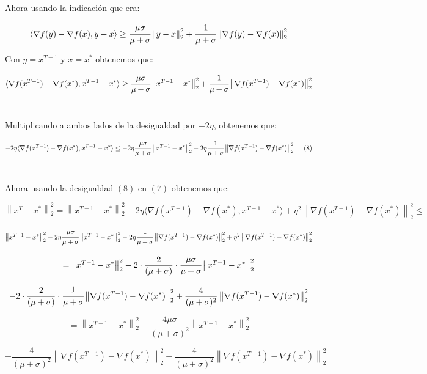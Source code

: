 \documentclass[11pt]{article}
\begin{document}
Ahora usando la indicación que era:

\[ \langle \nabla f(y) - \nabla f(x) , y - x \rangle  \geq  \cfrac{\mu \sigma}{\mu + \sigma} \left\| y-x \right\|_2^2 + \cfrac{1}{\mu + \sigma}\left\| \nabla f(y) - \nabla f(x) \right\|_2^2 \]

Con $ y = x^{T-1} $ y $ x = x^{*} $ obtenemos que: 

\[ \langle \nabla f(x^{T-1}) - \nabla f(x^{*}) , x^{T-1} - x^{*} \rangle  \geq  \cfrac{\mu \sigma}{\mu + \sigma} \left\| x^{T-1}-x^{*} \right\|_2^2 + \cfrac{1}{\mu + \sigma}\left\| \nabla f(x^{T-1}) - \nabla f(x^{*}) \right\|_2^2 \] \

Multiplicando a ambos lados de la desigualdad por $ - 2 \eta $, obtenemos que: 

\[ -2 \eta \langle \nabla f(x^{T-1}) - \nabla f(x^{*}) , x^{T-1} - x^{*} \rangle  \leq  - 2 \eta \cfrac{\mu \sigma}{\mu + \sigma} \left\| x^{T-1}-x^{*} \right\|_2^2 - 2 \eta \cfrac{1}{\mu + \sigma}\left\| \nabla f(x^{T-1}) - \nabla f(x^{*}) \right\|_2^2 \ \ \ \ (8) \] \

Ahora usando la desigualdad $(8)$ en $(7)$ obtenemos que:

\[ \left\| x^T - x^{*} \right\|_2^2 = \left\| x^{T-1} - x^{*} \right\|_2^2 - 2 \eta \langle \nabla f(x^{T-1}) - \nabla f(x^{*}) , x^{T-1} - x^{*} \rangle + \eta^2 \left\| \nabla f(x^{T-1}) - \nabla f(x^{*}) \right\|_2^2 \leq \]

\[ \left\| x^{T-1} - x^{*} \right\|_2^2 - 2 \eta \cfrac{\mu \sigma}{\mu + \sigma} \left\| x^{T-1}-x^{*} \right\|_2^2 - 2 \eta \cfrac{1}{\mu + \sigma}\left\| \nabla f(x^{T-1}) - \nabla f(x^{*}) \right\|_2^2 + \eta^2 \left\| \nabla f(x^{T-1}) - \nabla f(x^{*}) \right\|_2^2  \]

\[ = \left\| x^{T-1} - x^{*} \right\|_2^2 - 2 \cdot \frac{2}{(\mu+\sigma)} \cdot \cfrac{\mu \sigma}{\mu + \sigma} \left\| x^{T-1}-x^{*} \right\|_2^2   \]

\[ - 2 \cdot \frac{2}{(\mu+\sigma)} \cdot  \cfrac{1}{\mu + \sigma}\left\| \nabla f(x^{T-1}) - \nabla f(x^{*}) \right\|_2^2 + \frac{4}{(\mu + \sigma)^2} \left\| \nabla f(x^{T-1}) - \nabla f(x^{*}) \right\|_2^2 \]

\[ = \left\| x^{T-1} - x^{*} \right\|_2^2 - \frac{4 \mu \sigma}{(\mu+\sigma)^2}  \left\| x^{T-1}-x^{*} \right\|_2^2   \]

\[ -  \frac{4}{(\mu+\sigma)^2} \left\| \nabla f(x^{T-1}) - \nabla f(x^{*}) \right\|_2^2 + \frac{4}{(\mu + \sigma)^2} \left\| \nabla f(x^{T-1}) - \nabla f(x^{*}) \right\|_2^2 \]
\end{document}
